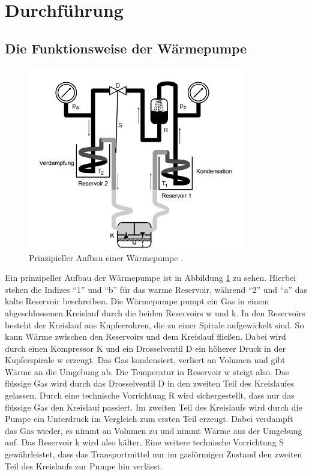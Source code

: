 \section{Durchführung}
\subsection{Die Funktionsweise der Wärmepumpe \cite[vgl.][]{man:v206}} %
\label{sec:funktionsweise}

\begin{figure}[H]
    \centering
    \includegraphics[height=8cm]{prinzipellerAufbau.png}
    \caption[]{Prinzipieller Aufbau einer Wärmepumpe \cite[]{man:v206}.}
    \label{fig:prinzipieller_aufbau}
\end{figure}

Ein prinzipeller Aufbau der Wärmepumpe ist in Abbildung \ref{fig:prinzipieller_aufbau} zu sehen.
Hierbei stehen die Indizes \enquote{1} und \enquote{b} für das warme Reservoir,
während \enquote{2} und \enquote{a} das kalte Reservoir beschreiben.
Die Wärmepumpe pumpt ein Gas in einem abgeschlossenen Kreislauf durch die beiden Reservoirs w und k.
In den Reservoirs besteht der Kreislauf aus Kupferrohren, die zu einer Spirale aufgewickelt sind.
So kann Wärme zwischen den Reservoirs und dem Kreislauf fließen.
Dabei wird durch einen Kompressor K und ein Drosselventil D ein höherer Druck in der Kupferspirale w erzeugt.
Das Gas kondensiert, verliert an Volumen und gibt Wärme an die Umgebung ab.
Die Temperatur in Reservoir w steigt also. 
Das flüssige Gas wird durch das Drosselventil D in den zweiten Teil des Kreislaufes gelassen.
Durch eine technische Vorrichtung R wird sichergestellt, dass nur das flüssige Gas den Kreislauf passiert.
Im zweiten Teil des Kreislaufs wird durch die Pumpe ein Unterdruck im Vergleich zum ersten Teil erzeugt.
Dabei verdampft das Gas wieder, es nimmt an Volumen zu und nimmt Wärme aus der Umgebung auf.
Das Reservoir k wird also kälter.
Eine weitere technische Vorrichtung S gewährleistet, dass das Transportmittel nur im gasförmigen Zustand 
den zweiten Teil des Kreislaufs zur Pumpe hin verlässt.

